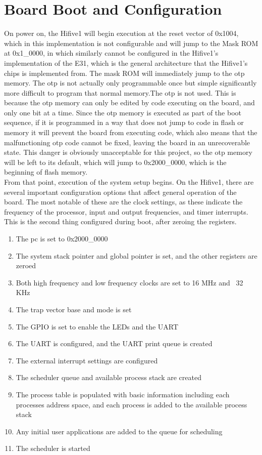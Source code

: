 \section{Board Boot and Configuration}
On power on, the Hifive1 will begin execution at the reset vector of 0x1004, which in this implementation is not configurable and will jump to the Mask ROM at 0x1\_0000, in which similarly cannot be configured in the Hifive1's implementation of the E31, which is the general architecture that the Hifive1's chips is implemented from. The mask ROM will immediately jump to the \ac{otp} memory. The \ac{otp} is not actually only programmable once but simple significantly more difficult to program that normal memory.The \ac{otp} is not used. This is because the \ac{otp} memory can only be edited by code executing on the board, and only one bit at a time. Since the \ac{otp} memory is executed as part of the boot sequence, if it is programmed in a way that does not jump to code in flash or memory it will prevent the board from executing code, which also means that the malfunctioning \ac{otp} code cannot be fixed, leaving the board in an unrecoverable state. This danger is obviously unacceptable for this project, so the \ac{otp} memory will be left to its default, which will jump to 0x2000\_0000, which is the beginning of flash memory.\\
From that point, execution of the system setup begins.
On the Hifive1, there are several important configuration options that affect general operation of the board. The most notable of these are the clock settings, as these indicate the frequency of the processor, input and output frequencies, and timer interrupts. This is the second thing configured during boot, after zeroing the registers.
\begin{enumerate}
    \item The pc is set to 0x2000\_0000
    \item The system stack pointer and global pointer is set, and the other registers are zeroed
    \item Both high frequency and low frequency clocks are set to 16 MHz and ~32 KHz
    \item The trap vector base and mode is set
    \item The GPIO is set to enable the LEDs and the UART
    \item The UART is configured, and the UART print queue is created
    \item The external interrupt settings are configured
    \item The scheduler queue and available process stack are created
    \item The process table is populated with basic information including each processes address space, and each process is added to the available process stack
    \item Any initial user applications are added to the queue for scheduling
    \item The scheduler is started
\end{enumerate}

